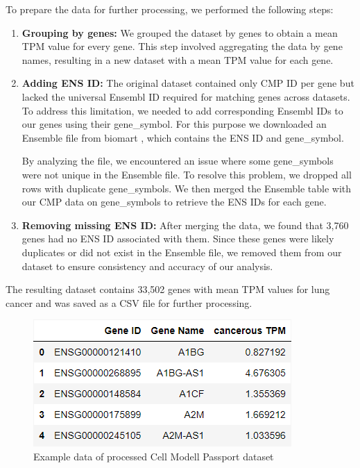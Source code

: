 To prepare the data for further processing, we performed the following steps:
\begin{enumerate}
    \item \textbf{Grouping by genes:} We grouped the dataset by genes to obtain a mean TPM value for every gene.
    This step involved aggregating the data by gene names, resulting in a new dataset with a mean TPM value for each gene.
    \item \textbf{Adding ENS ID:}
    The original dataset contained only CMP ID per gene but lacked the universal Ensembl ID required for matching genes across datasets.
    To address this limitation, we needed to add corresponding Ensembl IDs to our genes using their gene\_symbol.
    For this purpose we downloaded an Ensemble file from biomart \cite{bio_marts},
    which contains the ENS ID and gene\_symbol.

    By analyzing the file, we encountered an issue where some gene\_symbols were not unique in the Ensemble file.
    To resolve this problem, we dropped all rows with duplicate gene\_symbols. %
    We then merged the Ensemble table with our CMP data on gene\_symbols to retrieve the ENS IDs for each gene.

    \item \textbf{Removing missing ENS ID:} After merging the data, we found that 3,760 genes had no ENS ID associated with them.
    Since these genes were likely duplicates or did not exist in the Ensemble file,
    we removed them from our dataset to ensure consistency and accuracy of our analysis.
\end{enumerate}
The resulting dataset contains 33,502 genes with mean TPM values for lung cancer and was saved as a CSV file for further processing.



\begin{figure}[h]
    \centering
    \includegraphics[height=\dfheight]{figures/03_01_CMP_cancer_mean}
    \caption{Example data of processed Cell Modell Passport dataset}
    \label{fig:03_01_df_CMP_cancer_mean}
\end{figure}

